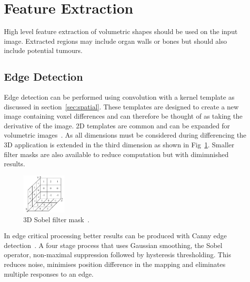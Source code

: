 \documentclass[journal]{IEEEtran}
\begin{document}
\section{Feature Extraction}
\label{sec:extraction}

High level feature extraction of volumetric shapes should be used on the input image.
Extracted regions may include organ walls or bones but should also include potential tumours.


\subsection{Edge Detection}
\label{sec:edge}
Edge detection can be performed using convolution with a kernel template as discussed in section~\ref{sec:spatial}. 
These templates are designed to create a new image containing voxel differences and can therefore be thought of as taking the derivative of the image.
2D templates are common and can be expanded for volumetric images~\cite{nixon02feature}.
As all dimensions must be considered during differencing the 3D application is extended in the third dimension as shown in Fig~\ref{fig:sobel}.
Smaller filter masks are also available to reduce computation but with dimimnished results.

\begin{figure}[!htb]
   \centering
   \includegraphics[width = 0.2\textwidth]{Figures/Sobel.pdf}
   \caption{3D Sobel filter mask~\cite{lohmann1998volumetric}.}
   \label{fig:sobel}
\end{figure}

In edge critical processing better results can be produced with Canny edge detection~\cite{canny86edge}. 
A four stage process that uses Gaussian smoothing, the Sobel operator, non-maximal suppression followed by hysteresis thresholding.
This reduces noise, minimises position difference in the mapping and eliminates multiple responses to an edge.
\end{document}
